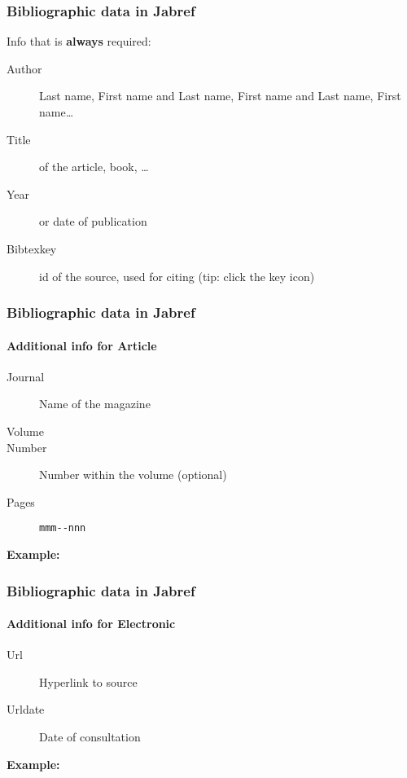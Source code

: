 \documentclass[aspectratio=169]{beamer}
\begin{document}
\begin{frame}
  \frametitle{Bibliographic data in Jabref}
  
  Info that is \textbf{always} required:
  
  \begin{description}
    \item[Author] Last name, First name and Last name, First name and Last name, First name\ldots
    \item[Title] of the article, book, \ldots
    \item[Year] or date of publication
    \item[Bibtexkey] id of the source, used for citing (tip: click the key icon)
  \end{description}
\end{frame}

\begin{frame}[fragile]
  \frametitle{Bibliographic data in Jabref}
  \framesubtitle{Additional info for Article}
  
  \begin{description}
    \item[Journal] Name of the magazine
    \item[Volume] 
    \item[Number] Number within the volume (optional)
    \item[Pages] \verb|mmm--nnn|
  \end{description}

  \bigskip
  
  \textbf{Example:}
  
  \bigskip
  
\end{frame}

\begin{frame}
  \frametitle{Bibliographic data in Jabref}
  \framesubtitle{Additional info for Electronic}
  
  \begin{description}
    \item[Url] Hyperlink to source
    \item[Urldate] Date of consultation
  \end{description}

  \bigskip

  \textbf{Example:}

  \bigskip


\end{frame}
\end{document}
